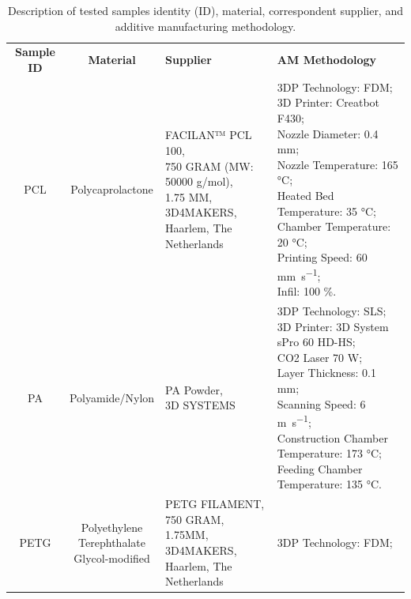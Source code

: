 \begin{table}
\caption{Description of tested samples identity (ID), material, correspondent supplier, and additive manufacturing methodology.}
\bigskip
\tiny
\centering
\begin{tabularx}{325px}{c c l l} \toprule[0.15em]
\textbf{Sample ID}	& \textbf{Material}	& \textbf{Supplier} & \textbf{AM Methodology}\\ \cmidrule(l){1-4}

PCL & Polycaprolactone 
& \makecell[l]{FACILAN™ PCL 100,\\ 750 GRAM (MW: 50000 g/mol),\\ 1.75 MM,\\ 3D4MAKERS,\\ Haarlem, The Netherlands}
& \makecell[l]{
3DP Technology: FDM;\\
3D Printer: Creatbot F430;\\
Nozzle Diameter: 0.4 \si{\milli\meter};\\
Nozzle Temperature: 165 \si{\celsius};\\
Heated Bed Temperature: 35 \si{\celsius};\\
Chamber Temperature: 20 \si{\celsius};\\
Printing Speed: 60 \si{\milli\meter\per\second};\\
Infil: 100 \si{\percent}.}
\\ \cmidrule(l){1-4}
PA			
& Polyamide/Nylon			
& \makecell*[l]{PA Powder,\\ 3D SYSTEMS}		
& \makecell*[l]{3DP Technology: SLS;\\
3D Printer: 3D System sPro 60 HD-HS;\\
CO2 Laser 70 \si{\watt};\\
Layer Thickness:  0.1 \si{\milli\meter};\\
Scanning Speed: 6 \si{\meter\per\second};\\
Construction Chamber Temperature: 173 \si{\celsius};\\
Feeding Chamber Temperature: 135 \si{\celsius}.}
\\ \cmidrule(l){1-4}
PETG			
& \makecell{Polyethylene\\ Terephthalate\\ Glycol-modified}
& \makecell[l]{PETG FILAMENT,\\ 750 GRAM,\\ 1.75MM,\\ 3D4MAKERS,\\ Haarlem, The Netherlands}
& \makecell[l]{
3DP Technology: FDM;\\
}
\end{tabularx}
\end{table}
